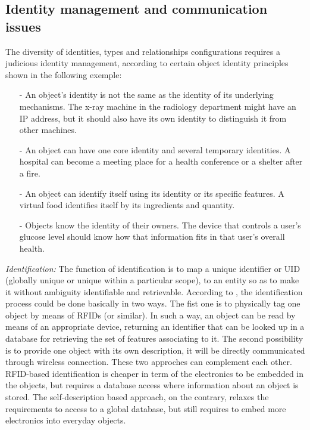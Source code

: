 \documentclass[10pt, twocolumn]{article}
\begin{document}
\subsection{Identity management and communication issues} 
The diversity of identities, types and relationships configurations requires a judicious identity management, according to certain object identity principles shown in the following exemple: 
\begin{itemize}
\item[-] An object’s identity is not the same as the identity of its underlying mechanisms. The x-ray machine in the radiology department might have an IP address, but it should also have its own identity to distinguish it from other machines.  
\item[-]An object can have one core identity and several temporary identities. A hospital can become a meeting place for a health conference or a shelter after a fire.  
\item[-]An object can identify itself using its identity or its specific features. A virtual food identifies itself by its ingredients and quantity. 
\item[-]Objects know the identity of their owners. The device that controls a user's glucose level should know how that information fits in that user’s overall health.  
\end{itemize}
\emph{Identification: }The function of identification is to map a unique identifier or UID (globally unique or unique within a particular scope), to an entity so as to make it without ambiguity identifiable and retrievable. According to \cite{ref2}, the identification process could be done basically in two ways. The fist one is to physically tag one object by means of RFIDs (or similar). In such a way, an object can be read by means of an appropriate device, returning an identifier that can be looked up in a database for retrieving the set of features associating to it. The second possibility is to provide one object with its own description, it will be directly communicated through wireless connection. These two approches can complement each other. RFID-based identification is cheaper in term of the electronics to be embedded in the objects, but requires a database access where information about an object is stored. The self-description based approach, on the contrary, relaxes the requirements to access to a global database, but still requires to embed more electronics into everyday objects. 
\end{document}
